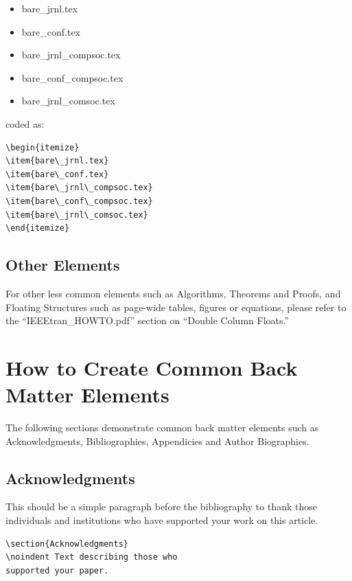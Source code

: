 \documentclass[lettersize,journal]{IEEEtran}
\begin{document}

\begin{itemize}
\item{bare\_jrnl.tex}
\item{bare\_conf.tex}
\item{bare\_jrnl\_compsoc.tex}
\item{bare\_conf\_compsoc.tex}
\item{bare\_jrnl\_comsoc.tex}
\end{itemize}

\noindent coded as:

\begin{verbatim}
\begin{itemize}
\item{bare\_jrnl.tex}
\item{bare\_conf.tex}
\item{bare\_jrnl\_compsoc.tex}
\item{bare\_conf\_compsoc.tex}
\item{bare\_jrnl\_comsoc.tex}
\end{itemize}
\end{verbatim}


\subsection{Other Elements}
\noindent For other less common elements such as Algorithms, Theorems and Proofs, and Floating Structures such as page-wide tables, figures or equations, please refer to the ``IEEEtran\_HOWTO.pdf'' section on ``Double Column Floats.''


\section{How to Create Common Back Matter Elements}
\noindent The following sections demonstrate common back matter elements such as Acknowledgments, Bibliographies, Appendicies and Author Biographies.

\subsection{Acknowledgments}
\noindent This should be a simple paragraph before the bibliography to thank those individuals and institutions who have supported your work on this article.

\begin{verbatim}
\section{Acknowledgments}
\noindent Text describing those who
supported your paper.
\end{verbatim}
\end{document}
